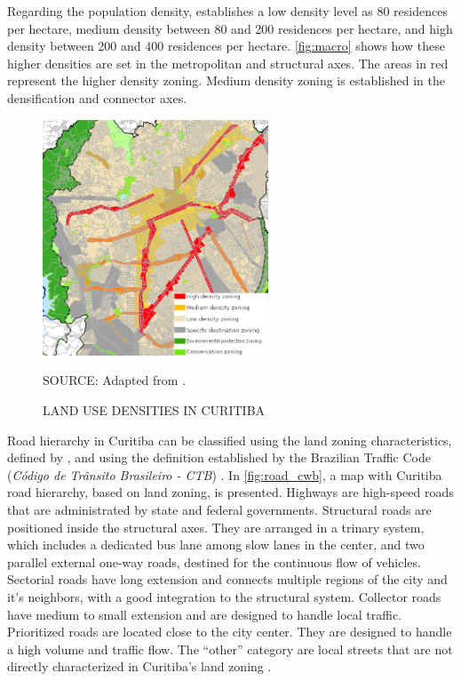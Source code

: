 Regarding the population density, \textcite{Curitiba2015} establishes a low density level as 80 residences per hectare, medium density between 80 and 200 residences per hectare, and high density between 200 and 400 residences per hectare. \autoref{fig:macro} shows how these higher densities are set in the metropolitan and structural axes. The areas in red represent the higher density zoning. Medium density zoning is established in the densification and connector axes. 

\begin{figure}[!htbp]
    \centering\footnotesize
    \captionsetup{font=footnotesize}
    \caption{LAND USE DENSITIES IN CURITIBA}
    \includegraphics[width=0.6\textwidth]{fig/macro3.png}
    \label{fig:macro}
    \par SOURCE: Adapted from \textcite{Curitiba2015}.
\end{figure}

Road hierarchy in Curitiba can be classified using the land zoning characteristics, defined by \textcite{Curitiba2019a}, and using the definition established by the Brazilian Traffic Code (\textit{Código de Trânsito Brasileiro - CTB}) \cite{Brasil1997}. In \autoref{fig:road_cwb}, a map with Curitiba road hierarchy, based on land zoning, is presented. Highways are high-speed roads that are administrated by state and federal governments. Structural roads are positioned inside the structural axes. They are arranged in a trinary system, which includes a dedicated bus lane among slow lanes in the center, and two parallel external one-way roads, destined for the continuous flow of vehicles. Sectorial roads have long extension and connects multiple regions of the city and it's neighbors, with a good integration to the structural system. Collector roads have medium to small extension and are designed to handle local traffic. Prioritized roads are located close to the city center. They are designed to handle a high volume and traffic flow. The ``other'' category are local streets that are not directly characterized in Curitiba's land zoning \cite{Curitiba2019a}. 

